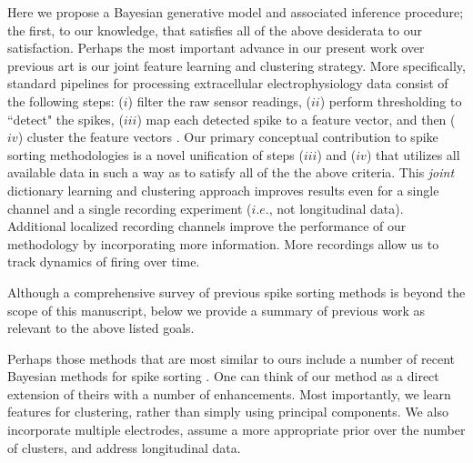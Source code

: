 \documentclass[journal]{IEEEtran}
\begin{document}
Here we propose a Bayesian generative model and associated inference procedure; the first, to our knowledge, that satisfies all of the above desiderata to our satisfaction.
% 
Perhaps the most important advance in our present work over previous art is our joint feature learning and clustering strategy.  More specifically, 
% 
standard pipelines for processing extracellular electrophysiology data consist of the following steps:
($i$) filter the raw sensor readings, 
($ii$) perform thresholding to ``detect" the spikes, 
($iii$) map each detected spike to a feature vector, and then
($iv$)  cluster the feature vectors
\cite{Lewicki}. 
Our primary conceptual contribution to spike sorting methodologies is a novel unification of steps ($iii$) and ($iv$) that utilizes all available data in such a way as to satisfy all of the the above criteria. This \emph{joint} dictionary learning and clustering approach improves results even for a single channel and a single recording experiment ($i.e.$, not longitudinal data).  Additional localized recording channels improve the performance of our methodology by incorporating more information.  More recordings allow us to track dynamics of firing over time.
%

Although a comprehensive survey of previous spike sorting methods is beyond the scope of this manuscript, below we provide a summary of previous work as relevant to the above listed goals.

Perhaps those methods that are most similar to ours include a number of recent Bayesian methods for spike sorting \cite{Wood2009,Bo2011}.  One can think of our method as a direct extension of theirs with a number of enhancements. Most importantly, we learn features for clustering, rather than simply using principal components. We also incorporate multiple electrodes,  assume a more appropriate prior over the number of clusters, and address longitudinal data.
\end{document}
